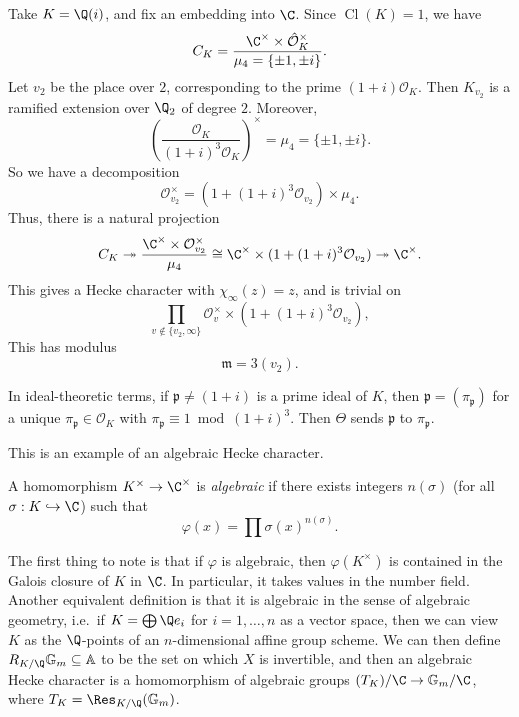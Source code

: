 \documentclass[a4paper]{article}
\renewcommand\G{\mathbb{G}}
\newcommand\A{\mathbb{A}}
\DeclareMathOperator\Cl{\mathrm{Cl}}
\begin{document}
\begin{eg}
  Take $K = \Q(i)$, and fix an embedding into $\C$. Since $\Cl(K) = 1$, we have
  \[
    C_K = \frac{\C^\times \times \hat{\mathcal{O}}_K^\times}{\mu_4 = \{\pm 1, \pm i\}}.
  \]
  Let $v_2$ be the place over $2$, corresponding to the prime $(1 + i) \mathcal{O}_K$. Then $K_{v_2}$ is a ramified extension over $\Q_2$ of degree $2$. Moreover,
  \[
    \left(\frac{\mathcal{O}_K}{(1 + i)^3 \mathcal{O}_K}\right)^\times = \mu_4 = \{\pm 1, \pm i\}.
  \]
  So we have a decomposition
  \[
    \mathcal{O}_{v_2}^\times = (1 + (1 + i)^3 \mathcal{O}_{v_2}) \times \mu_4.
  \]
  Thus, there is a natural projection
  \[
    C_K \twoheadrightarrow \frac{\C^\times \times \mathcal{O}_{v_2}^\times}{\mu_4} \cong \C^\times \times (1 + (1 + i)^3 \mathcal{O}_{v_2}) \twoheadrightarrow \C^\times.
  \]
  This gives a Hecke character with $\chi_\infty(z) = z$, and is trivial on
  \[
    \prod_{v \not \in \{v_2, \infty\}} \mathcal{O}_v^\times \times (1 + (1 + i)^3 \mathcal{O}_{v_2}),
  \]
  This has modulus
  \[
    \mathfrak{m} = 3 (v_2).
  \]

  In ideal-theoretic terms, if $\mathfrak{p} \not= (1 + i)$ is a prime ideal of $K$, then $\mathfrak{p} = (\pi_\mathfrak{p})$ for a unique $\pi_\mathfrak{p} \in \mathcal{O}_K$ with $\pi_\mathfrak{p} \equiv 1 \bmod (1 + i)^3$. Then $\Theta$ sends $\mathfrak{p}$ to $\pi_\mathfrak{p}$.
%
%
\end{eg}

This is an example of an algebraic Hecke character.
\begin{defi}
  A homomorphism $K^\times \to \C^\times$ is \emph{algebraic} if there exists integers $n(\sigma)$ (for all $\sigma: K \hookrightarrow \C$) such that
  \[
    \varphi(x) = \prod \sigma(x)^{n(\sigma)}.
  \]
\end{defi}
The first thing to note is that if $\varphi$ is algebraic, then $\varphi(K^\times)$ is contained in the Galois closure of $K$ in $\C$. In particular, it takes values in the number field. Another equivalent definition is that it is algebraic in the sense of algebraic geometry, i.e.\ if $K = \bigoplus \Q e_i$ for $i = 1, \ldots, n$ as a vector space, then we can view $K$ as the $\Q$-points of an $n$-dimensional affine group scheme. We can then define $R_{K/\Q} \G_m \subseteq \A$ to be the set on which $X$ is invertible, and then an algebraic Hecke character is a homomorphism of algebraic groups $(T_K)/\C \to \G_m/\C$, where $T_K = \Res_{K/\Q}(\G_m)$.
\end{document}
